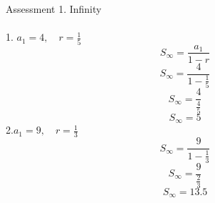 \documentclass{article}
\begin{document}
    \newpage
    Assessment 1. Infinity\\\\
    1. \quad $a_1=4,\quad r=\frac{1}{5}$\begin{equation}
        S_{\infty}=\frac{a_1}{1-r}
    \end{equation}
    \begin{equation}
        S_{\infty}=\frac{4}{1-\frac{1}{5}}
    \end{equation}
    \begin{equation}
        S_{\infty}=\frac{4}{\frac{4}{5}}
    \end{equation}
    \begin{equation}
        S_{\infty}=5
    \end{equation}
    2.\quad$a_1=9,\quad r=\frac{1}{3}$\begin{equation}
        S_{\infty}=\frac{9}{1-\frac{1}{3}}
    \end{equation}
    \begin{equation}
        S_{\infty}=\frac{9}{\frac{2}{3}}
    \end{equation}
    \begin{equation}
        S_{\infty}=13.5
    \end{equation}
\end{document}
